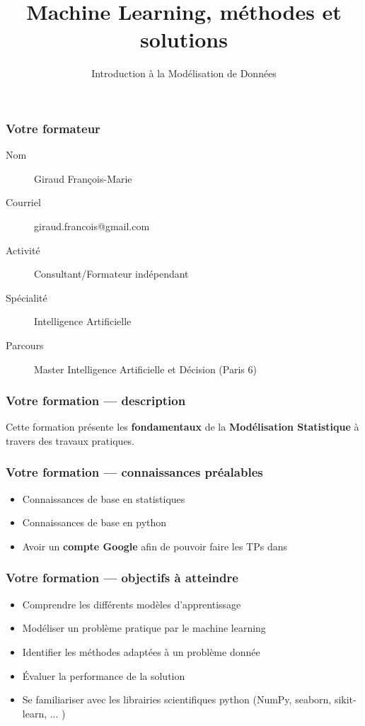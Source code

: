 \documentclass{formation}
\title{Machine Learning, méthodes et solutions}
\subtitle{Introduction à la Modélisation de Données}
\begin{document}
\maketitle

\begin{frame}
  \frametitle{Votre formateur}
  \begin{description}
  \item[Nom] Giraud François-Marie
  \item[Courriel] giraud.francois@gmail.com
  \item[Activité] Consultant/Formateur indépendant
  \item[Spécialité] Intelligence Artificielle
  \item[Parcours] Master Intelligence Artificielle et Décision (Paris 6)
  \end{description}
\end{frame}

\begin{frame}
  \frametitle{Votre formation — description}
  Cette formation présente les \textbf{fondamentaux} de la \textbf{Modélisation Statistique} à travers des travaux pratiques. \\
\end{frame}

\begin{frame}
  \frametitle{Votre formation — connaissances préalables}
  \begin{itemize}
  \item Connaissances de base en statistiques
  \item Connaissances de base en python
  \item Avoir un \textbf{compte Google} afin de pouvoir faire les TPs dans 
  \end{itemize}
\end{frame}

\begin{frame}
  \frametitle{Votre formation — objectifs à atteindre}
  \begin{itemize}
  \item Comprendre les différents modèles d'apprentissage
  \item Modéliser un problème pratique par le machine learning
  \item Identifier les méthodes adaptées à un problème donnée
  \item Évaluer la performance de la solution
  \item Se familiariser avec les librairies scientifiques python (NumPy, seaborn, sikit-learn, ... )
  \end{itemize}
\end{frame}
\end{document}
